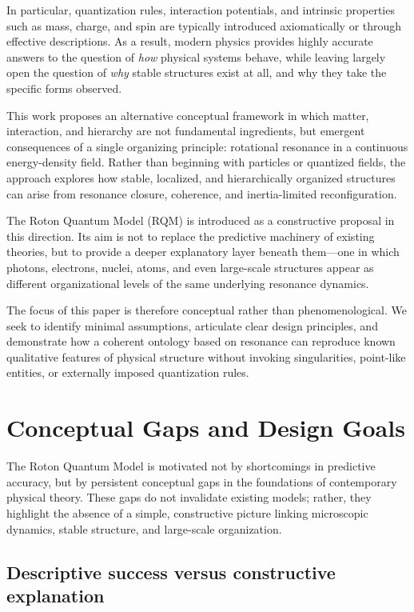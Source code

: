 \documentclass[11pt,a4paper]{article}
\begin{document}
In particular, quantization rules, interaction potentials, and intrinsic properties such as
mass, charge, and spin are typically introduced axiomatically or through effective
descriptions. As a result, modern physics provides highly accurate answers to the question
of \emph{how} physical systems behave, while leaving largely open the question of
\emph{why} stable structures exist at all, and why they take the specific forms observed.

This work proposes an alternative conceptual framework in which matter, interaction, and
hierarchy are not fundamental ingredients, but emergent consequences of a single organizing
principle: rotational resonance in a continuous energy-density field. Rather than beginning
with particles or quantized fields, the approach explores how stable, localized, and
hierarchically organized structures can arise from resonance closure, coherence, and
inertia-limited reconfiguration.

The Roton Quantum Model (RQM) is introduced as a constructive proposal in this direction.
Its aim is not to replace the predictive machinery of existing theories, but to provide a
deeper explanatory layer beneath them—one in which photons, electrons, nuclei, atoms, and
even large-scale structures appear as different organizational levels of the same underlying
resonance dynamics.

The focus of this paper is therefore conceptual rather than phenomenological. We seek to
identify minimal assumptions, articulate clear design principles, and demonstrate how a
coherent ontology based on resonance can reproduce known qualitative features of physical
structure without invoking singularities, point-like entities, or externally imposed
quantization rules.


\section{Conceptual Gaps and Design Goals}
\label{sec:design_goals}

The Roton Quantum Model is motivated not by shortcomings in predictive accuracy, but by
persistent conceptual gaps in the foundations of contemporary physical theory. These gaps
do not invalidate existing models; rather, they highlight the absence of a simple,
constructive picture linking microscopic dynamics, stable structure, and large-scale
organization.

\subsection{Descriptive success versus constructive explanation}
\end{document}
